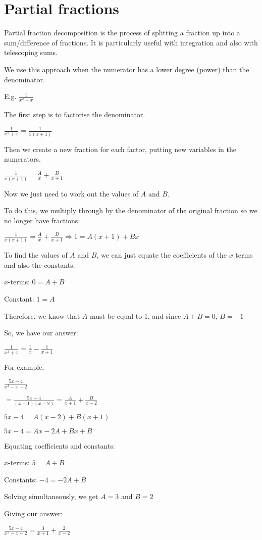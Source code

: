 \documentclass[../main.tex]{subfiles}
\begin{document}
\section{Partial fractions}
Partial fraction decomposition is the process of splitting a fraction up into a sum/difference of fractions. It is particularly useful with integration and also with telescoping sums.

We use this approach when the numerator has a lower degree (power) than the denominator.

E.g. $\frac{1}{x^2+x}$

The first step is to factorise the denominator.

$\frac{1}{x^2+x}=\frac{1}{x(x+1)}$

Then we create a new fraction for each factor, putting new variables in the numerators.

$\frac{1}{x(x+1)}=\frac{A}{x}+\frac{B}{x+1}$

Now we just need to work out the values of $A$ and $B$.

To do this, we multiply through by the denominator of the original fraction so we no longer have fractions:

$\frac{1}{x(x+1)}=\frac{A}{x}+\frac{B}{x+1} \Rightarrow 1=A(x+1)+Bx$

To find the values of $A$ and $B$, we can just equate the coefficients of the $x$ terms and also the constants.

$x$-terms: $0=A+B$

Constant: $1=A$

Therefore, we know that $A$ must be equal to 1, and since $A + B = 0$, $B=-1$

So, we have our answer:

$\frac{1}{x^2+x}=\frac{1}{x}-\frac{1}{x+1}$

For example,

$\frac{5x-4}{x^2-x-2}$

$=\frac{5x-4}{(x+1)(x-2)}=\frac{A}{x+1}+\frac{B}{x-2}$

$5x-4=A(x-2)+B(x+1)$

$5x-4=Ax-2A+Bx+B$

Equating coefficients and constants:

$x$-terms: $5=A+B$

Constants: $-4=-2A+B$

Solving simultaneously, we get $A=3$ and $B=2$

Giving our answer:

$\frac{5x-4}{x^2-x-2}=\frac{3}{x+1}+\frac{2}{x-2}$
\end{document}

